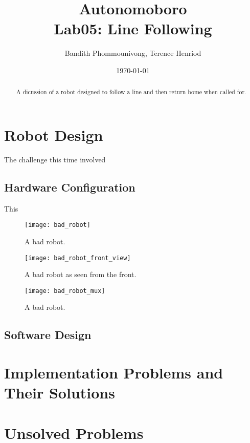 \documentclass{article}
\title{Autonomoboro \\ Lab05: Line Following}
\author{Bandith Phommounivong, Terence Henriod}
\date{\today}
\begin{document}
\maketitle

\begin{abstract}
A dicussion of a robot designed to follow a line and then return home when called for.
\end{abstract}

\newpage

\section{Robot Design}

The challenge this time involved 

\subsection{Hardware Configuration}
This

	\begin{figure}[h!]
	\centering
	\texttt{[image: bad\_robot]}
	\caption{A bad robot.}
	\label{fig:bad_robot}
	\end{figure}

    \begin{figure}[h!]
    \centering
    \texttt{[image: bad\_robot\_front\_view]}
    \caption{A bad robot as seen from the front.}
    \label{fig:bad_robot_front_view}
    \end{figure}


    \begin{figure}[h!]
    \centering
    \texttt{[image: bad\_robot\_mux]}
    \caption{A bad robot.}
    \label{fig:bad_robot_mux}
    \end{figure}

\subsection{Software Design}


\section{Implementation Problems and Their Solutions}


\section{Unsolved Problems}
\end{document}
